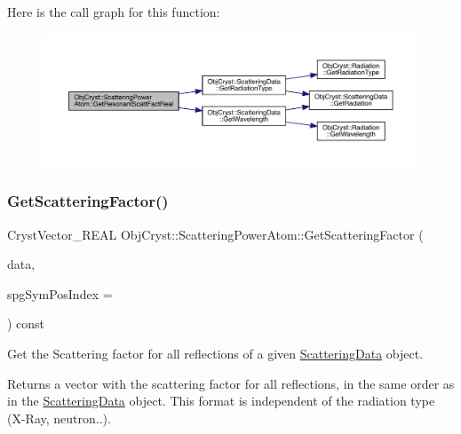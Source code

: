 Here is the call graph for this function\+:
\nopagebreak
\begin{figure}[H]
\begin{center}
\leavevmode
\includegraphics[width=350pt]{class_obj_cryst_1_1_scattering_power_atom_a38d48cd95ad51e9d83bfeb59988492c1_cgraph}
\end{center}
\end{figure}
\mbox{\label{class_obj_cryst_1_1_scattering_power_atom_a2ae5ca3726d70f371acfbafc97d300ab}} 
\subsubsection{\texorpdfstring{GetScatteringFactor()}{GetScatteringFactor()}}
{\footnotesize\ttfamily Cryst\+Vector\+\_\+\+R\+E\+AL Obj\+Cryst\+::\+Scattering\+Power\+Atom\+::\+Get\+Scattering\+Factor (\begin{DoxyParamCaption}\item[{const \mbox{\hyperlink{class_obj_cryst_1_1_scattering_data}{Scattering\+Data}} \&}]{data,  }\item[{const int}]{spg\+Sym\+Pos\+Index = {} }\end{DoxyParamCaption}) const\hspace{0.3cm}{\ttfamily [virtual]}}



Get the Scattering factor for all reflections of a given \mbox{\hyperlink{class_obj_cryst_1_1_scattering_data}{Scattering\+Data}} object. 

\begin{DoxyReturn}{Returns}
a vector with the scattering factor for all reflections, in the same order as in the \mbox{\hyperlink{class_obj_cryst_1_1_scattering_data}{Scattering\+Data}} object. This format is independent of the radiation type (X-\/\+Ray, neutron..). 
\end{DoxyReturn}

